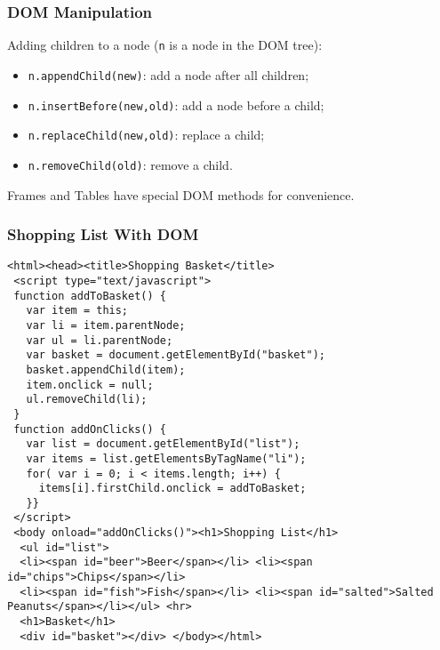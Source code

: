 \documentclass[svgnames]{beamer}
\begin{document}
\begin{frame}\frametitle{DOM Manipulation}

Adding children to a node (\texttt{n} is a node in the DOM tree):
\begin{itemize}
\item \texttt{n.appendChild(new)}: add a node after all children;
\item \texttt{n.insertBefore(new,old)}: add a node before a child;
\item \texttt{n.replaceChild(new,old)}: replace a child;
\item \texttt{n.removeChild(old)}: remove a child.
\end{itemize}

\medskip{}
Frames and Tables have special DOM methods for convenience. 
\end{frame}

\begin{frame}[fragile=singleslide] 
\frametitle{Shopping List With DOM}

\begin{scriptsize}
\begin{verbatim}
<html><head><title>Shopping Basket</title>
 <script type="text/javascript">
 function addToBasket() {
   var item = this;
   var li = item.parentNode;
   var ul = li.parentNode;
   var basket = document.getElementById("basket");
   basket.appendChild(item);
   item.onclick = null;
   ul.removeChild(li);
 }
 function addOnClicks() {
   var list = document.getElementById("list");
   var items = list.getElementsByTagName("li");
   for( var i = 0; i < items.length; i++) {
     items[i].firstChild.onclick = addToBasket;
   }}       
 </script>
 <body onload="addOnClicks()"><h1>Shopping List</h1>
  <ul id="list">
  <li><span id="beer">Beer</span></li> <li><span id="chips">Chips</span></li>
  <li><span id="fish">Fish</span></li> <li><span id="salted">Salted Peanuts</span></li></ul> <hr>
  <h1>Basket</h1>
  <div id="basket"></div> </body></html>
\end{verbatim}
\end{scriptsize}
  
\end{frame}
\end{document}
